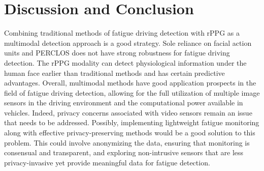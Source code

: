\documentclass[a4paper]{article}
\begin{document}
\section{Discussion and Conclusion}
Combining traditional methods of fatigue driving detection with rPPG as a multimodal detection approach is a good strategy. Sole reliance on facial action units and PERCLOS does not have strong robustness for fatigue driving detection. The rPPG modality can detect physiological information under the human face earlier than traditional methods and has certain predictive advantages. Overall, multimodal methods have good application prospects in the field of fatigue driving detection, allowing for the full utilization of multiple image sensors in the driving environment and the computational power available in vehicles.
Indeed, privacy concerns associated with video sensors remain an issue that needs to be addressed. Possibly, implementing lightweight fatigue monitoring along with effective privacy-preserving methods would be a good solution to this problem. This could involve anonymizing the data, ensuring that monitoring is consensual and transparent, and exploring non-intrusive sensors that are less privacy-invasive yet provide meaningful data for fatigue detection.



\end{document}
